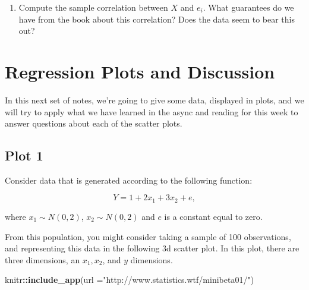 \documentclass[
]{book}
\newenvironment{Shaded}{\begin{snugshade}}{\end{snugshade}}
\newcommand{\AttributeTok}[1]{\textcolor[rgb]{0.13,0.29,0.53}{#1}}
\newcommand{\FunctionTok}[1]{\textcolor[rgb]{0.13,0.29,0.53}{\textbf{#1}}}
\newcommand{\NormalTok}[1]{#1}
\newcommand{\SpecialCharTok}[1]{\textcolor[rgb]{0.81,0.36,0.00}{\textbf{#1}}}
\newcommand{\StringTok}[1]{\textcolor[rgb]{0.31,0.60,0.02}{#1}}
\providecommand{\tightlist}{%
  \setlength{\itemsep}{0pt}\setlength{\parskip}{0pt}}
\theoremstyle{definition}
\theoremstyle{definition}
\theoremstyle{definition}
\theoremstyle{definition}
\theoremstyle{remark}
\begin{document}
\begin{enumerate}
\def\labelenumi{\arabic{enumi}.}
\setcounter{enumi}{6}
\tightlist
\item
  Compute the sample correlation between \(X\) and \(e_i\). What guarantees do we have from the book about this correlation? Does the data seem to bear this out?
\end{enumerate}

\section{Regression Plots and Discussion}\label{regression-plots-and-discussion}

In this next set of notes, we're going to give some data, displayed in plots, and we will try to apply what we have learned in the async and reading for this week to answer questions about each of the scatter plots.

\subsection{Plot 1}\label{plot-1}

Consider data that is generated according to the following function:

\[
  Y = 1 + 2x_1 + 3x_2 + e, 
\]

where \(x_1 \sim N(0,2)\), \(x_2 \sim N(0,2)\) and \(e\) is a constant equal to zero.

From this population, you might consider taking a sample of 100 observations, and representing this data in the following 3d scatter plot. In this plot, there are three dimensions, an \(x_1, x_2\), and \(y\) dimensions.

\begin{Shaded}
\begin{Highlighting}[]
\NormalTok{knitr}\SpecialCharTok{::}\FunctionTok{include\_app}\NormalTok{(}\AttributeTok{url =}\StringTok{"http://www.statistics.wtf/minibeta01/"}\NormalTok{)}
\end{Highlighting}
\end{Shaded}
\end{document}
